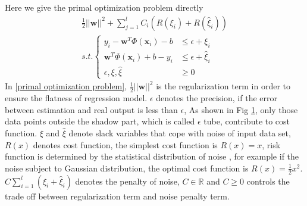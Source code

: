 \documentclass[12pt, draftclsnofoot, onecolumn]{IEEEtran}
\begin{document}
\begin{figure}
\centering
\def\svgwidth{\columnwidth}

\caption{}
\label{epsilon-SVR}
\end{figure}

Here we give the primal optimization problem directly
\begin{eqnarray}
\nonumber
\frac{1}{2}||\mathbf{w}||^{2}+\sum_{j=1}^{l}C_{i}(R(\xi_{i})+R(\hat{\xi}_{i}))\\
s.t. \left\{\begin{array}{ll}
y_{i}-\mathbf{w}^{T}\Phi(\mathbf{x}_{i})-b &\leq \epsilon+\xi_{i}\\
\mathbf{w}^{T}\Phi(\mathbf{x}_{i})+b-y_{i} &\leq \epsilon+\hat{\xi}_{i}\\
\epsilon, \xi,\hat{\xi} &\geq 0
\end{array}\right.
\label{primal optimization problem}
\end{eqnarray}
In \ref{primal optimization problem}, $\frac{1}{2}||\mathbf{w}||^{2}$ is the regularization term in order to ensure the flatness of regression model. $\epsilon$ denotes the precision, if the error between estimation and real output is less than $\epsilon$, As shown in Fig \ref{epsilon-SVR}, only those data points outside the shadow part, which is called $\epsilon$ tube, contribute to cost function. $\xi$ and $\hat{\xi}$ denote slack variables that cope with noise of input data set, $R(x)$ denotes cost function, the simplest cost function is $R(x)=x$, risk function is determined by the statistical distribution of noise \cite{A tutorial of Support Vector Regression}, for example if the noise subject to Gaussian distribution, the optimal cost function is $R(x)=\frac{1}{2}x^{2}$. $C\sum_{i=1}^{l}(\xi_{i}+\hat{\xi}_{i})$ denotes the penalty of noise, $C\in \mathbb{R}$ and $C\geq 0$ controls the trade off between regularization term and noise penalty term.
\end{document}
